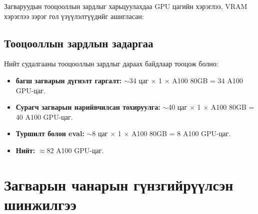 Загваруудын тооцооллын зардлыг харьцуулахдаа GPU цагийн хэрэглээ, VRAM хэрэглээ зэрэг гол үзүүлэлтүүдийг ашигласан:

\begin{table}[htbp]
\centering
\caption{Загваруудын тооцооллын зардлын харьцуулалт}
\label{tab:compute_cost}
\end{table}

\subsection{Тооцооллын зардлын задаргаа}

Нийт судалгааны тооцооллын зардлыг дараах байдлаар тооцож болно:

\begin{itemize}
    \item \textbf{багш загварын дүгнэлт гаргалт:} $\sim$34 цаг $\times$ 1 $\times$ A100 80GB = 34 A100 GPU-цаг.
    \item \textbf{Сурагч загварын нарийвчилсан тохируулга:} $\sim$40 цаг $\times$ 1 $\times$ A100 80GB = 40 A100 GPU-цаг.
    \item \textbf{Туршилт болон eval:} $\sim$8 цаг $\times$ 1 $\times$ A100 80GB = 8 A100 GPU-цаг.
    \item \textbf{Нийт:} $\approx$82 A100 GPU-цаг.
\end{itemize}

\section{Загварын чанарын гүнзгийрүүлсэн шинжилгээ}

